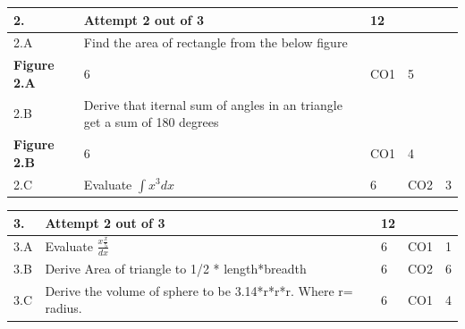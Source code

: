 \documentclass[12pt]{article}
\begin{document}
	\begin{longtable}{|L{1cm}|L{8cm}|C{1cm}|C{1cm}|C{1cm}|}\hline
	\bf2. & \bf{Attempt} \bf{2} \bf{out of} \bf{3} & \bf{12}  & & \\ \hline





		2.A &
	Find the area of rectangle from the below figure \newline
			\begin{center}
		\includegraphics[width=4cm,height=3cm]{media/diagrams/2020/09/14/rectsquare.png}\\\bf{Figure }\bf2.A		
	\end{center}
		
	 &  6 & CO1 & 5\\ \hline
		2.B &
	Derive that iternal sum of angles in an triangle get a sum of 180 degrees \newline
			\begin{center}
		\includegraphics[width=4cm,height=3cm]{media/diagrams/2020/09/14/rectsquare_k3vvwfe.png}\\\bf{Figure }\bf2.B		
	\end{center}
		
	 &  6 & CO1 & 4\\ \hline
		2.C &
	Evaluate $\int x^{3}dx$ \newline
			
	 &  6 & CO2 & 3\\ \hline
	\end{longtable}


\begin{longtable}{|L{1cm}|L{8cm}|C{1cm}|C{1cm}|C{1cm}|}\hline
	\bf3. & \bf{Attempt} \bf{2} \bf{out of} \bf{3} & \bf{12}  & & \\ \hline





		3.A &
	Evaluate $\frac{x\frac{x}{5}}{dx}$ \newline
			
	 &  6 & CO1 & 1\\ \hline
		3.B &
	Derive Area of triangle to 1/2 * length*breadth \newline
			
	 &  6 & CO2 & 6\\ \hline
		3.C &
	Derive the volume of sphere to be 3.14*r*r*r. Where r= radius. \newline
			
	 &  6 & CO1 & 4\\ \hline
	\end{longtable}
\end{document}
